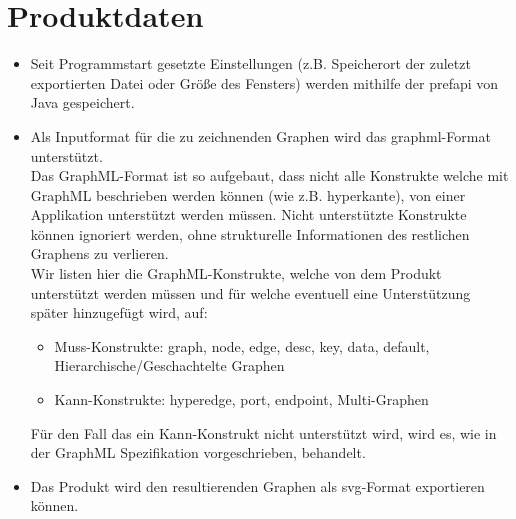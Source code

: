\chapter{Produktdaten}\label{ch:daten}

\begin{itemize}
  \item Seit Programmstart gesetzte Einstellungen (z.B. Speicherort der zuletzt exportierten Datei oder Größe des Fensters) werden mithilfe der \gls{prefapi} von Java gespeichert.
  \item Als Inputformat für die zu zeichnenden Graphen wird das \gls{graphml}-Format unterstützt.\\
    Das GraphML-Format ist so aufgebaut, dass nicht alle Konstrukte welche mit GraphML beschrieben werden können (wie z.B. \gls{hyperkante}),
    von einer Applikation unterstützt werden müssen.
    Nicht unterstützte Konstrukte können ignoriert werden, ohne strukturelle Informationen des restlichen Graphens zu verlieren.\\
    Wir listen hier die GraphML-Konstrukte, welche von dem Produkt unterstützt werden müssen und für welche eventuell eine Unterstützung später hinzugefügt wird, auf:
    \begin{itemize}
      \item Muss-Konstrukte: graph, node, edge, desc, key, data, default, Hierarchische/Geschachtelte Graphen  %
      \item Kann-Konstrukte: hyperedge, port, endpoint, Multi-Graphen
    \end{itemize}
    Für den Fall das ein Kann-Konstrukt nicht unterstützt wird, wird es, wie in der GraphML Spezifikation vorgeschrieben, behandelt.
  \item Das Produkt wird den resultierenden Graphen als \gls{svg}-Format exportieren können.
\end{itemize}
